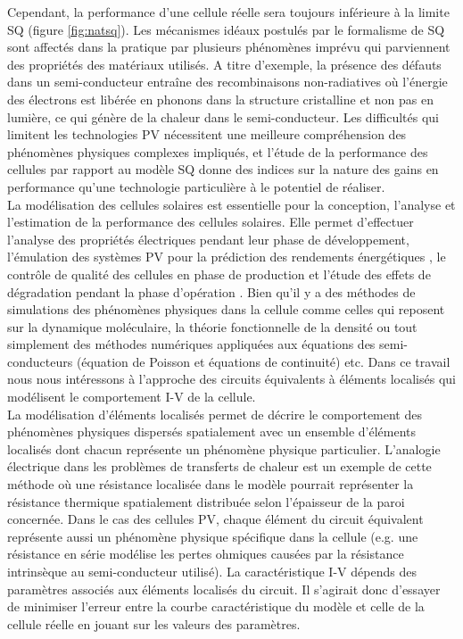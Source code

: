Cependant, la performance d'une cellule réelle sera toujours inférieure à la limite SQ (figure \ref{fig:natsq}). Les mécanismes idéaux postulés par le formalisme de SQ sont affectés dans la pratique par plusieurs phénomènes imprévu qui parviennent des propriétés des matériaux utilisés. A titre d'exemple, la présence des défauts dans un semi-conducteur entraîne des recombinaisons non-radiatives où l'énergie des électrons est libérée en phonons dans la structure cristalline et non pas en lumière, ce qui génère de la chaleur dans le semi-conducteur. Les difficultés qui limitent les technologies PV nécessitent une meilleure compréhension des phénomènes physiques complexes impliqués, et l'étude de la performance des cellules par rapport au modèle SQ donne des indices sur la nature des gains en performance qu'une technologie particulière à le potentiel de réaliser.\\
La modélisation des cellules solaires est essentielle pour la conception, l'analyse et l'estimation de la performance des cellules solaires. Elle permet d'effectuer l'analyse des propriétés électriques pendant leur phase de développement, l'émulation des systèmes PV pour la prédiction des rendements énergétiques \cite{Ram2018}, le contrôle de qualité des cellules en phase de production %
et l'étude des effets de dégradation pendant la phase d'opération \cite{Kennerud1969, Jamil2017}. Bien qu'il y a des méthodes de simulations des phénomènes physiques dans la cellule comme celles qui reposent sur la dynamique moléculaire, la théorie fonctionnelle de la densité ou tout simplement des méthodes numériques appliquées aux équations des semi-conducteurs (équation de Poisson et équations de continuité) etc. Dans ce travail nous nous intéressons à l'approche des circuits équivalents à éléments localisés qui modélisent le comportement I-V de la cellule.\\
La modélisation d'éléments localisés permet de décrire le comportement des phénomènes physiques dispersés spatialement avec un ensemble d'éléments localisés dont chacun représente un phénomène physique particulier. L'analogie électrique dans les problèmes de transferts de chaleur est un exemple de cette méthode où une résistance localisée dans le modèle pourrait représenter la résistance thermique spatialement distribuée selon l'épaisseur de la paroi concernée. Dans le cas des cellules PV, chaque élément du circuit équivalent représente aussi un phénomène physique spécifique dans la cellule (e.g. une résistance en série modélise les pertes ohmiques causées par la résistance intrinsèque au semi-conducteur utilisé). La caractéristique I-V dépends des paramètres associés aux éléments localisés du circuit. Il s'agirait donc d'essayer de minimiser l'erreur entre la courbe caractéristique du modèle et celle de la cellule réelle en jouant sur les valeurs des paramètres. 
